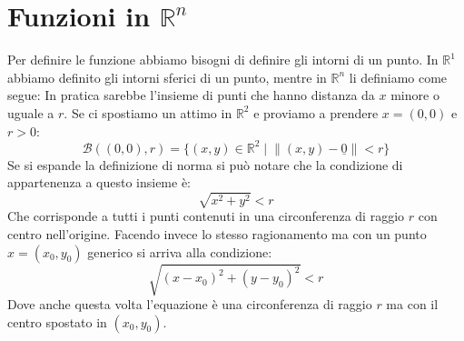 \section{Funzioni in $\mathbb{R}^n$}
Per definire le funzione abbiamo bisogni di definire gli intorni di un punto. 
In $\mathbb{R}^1$ abbiamo definito gli intorni sferici di un punto, mentre in 
$\mathbb{R}^n$ li definiamo come segue:
In pratica sarebbe l'insieme di punti che hanno distanza da $x$ minore o uguale 
a $r$. Se ci spostiamo un attimo in $\mathbb{R}^2$ e proviamo a prendere 
$x = (0, 0)$ e $r > 0$:
\begin{equation*}
	\mathcal{B}((0, 0), r) = \{(x, y) \in \mathbb{R}^2 \; | \; \lVert (x, y) - 
    \underline{0} \rVert < r\}
\end{equation*}
Se si espande la definizione di norma si può notare che la condizione di 
appartenenza a questo insieme è:
\begin{equation*}
	\sqrt{x^2 + y^2} < r
\end{equation*}
Che corrisponde a tutti i punti contenuti in una circonferenza di raggio $r$ 
con centro nell'origine. Facendo invece lo stesso ragionamento ma con un punto 
$x = (x_0, y_0)$ generico si arriva alla condizione:
\begin{equation*}
	\sqrt{(x - x_0)^2 + (y - y_0)^2} < r
\end{equation*}
Dove anche questa volta l'equazione è una circonferenza di raggio $r$ ma con 
il centro spostato in $(x_0, y_0)$.


